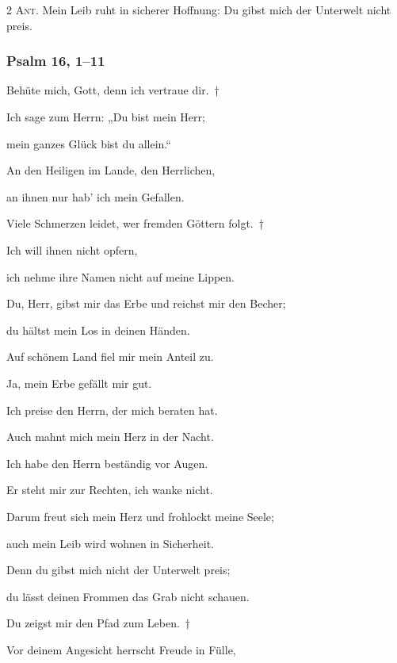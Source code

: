 \vspace{10pt}

\noindent \textsc{2 Ant.} Mein Leib ruht in sicherer Hoffnung: Du gibst mich der Unterwelt nicht preis.

\subsubsection{Psalm 16, 1--11}

\noindent Behüte mich, Gott, denn ich vertraue dir.~†~\nopagebreak

Ich sage zum Herrn: „Du bist mein Herr;~\GreStar{}~\nopagebreak

mein ganzes Glück bist du allein.“

\noindent An den Heiligen im Lande, den Herrlichen,~\GreStar{}~\nopagebreak

an ihnen nur hab’ ich mein Gefallen.

\noindent Viele Schmerzen leidet, wer fremden Göttern folgt.~†~\nopagebreak

Ich will ihnen nicht opfern,~\GreStar{}~\nopagebreak

ich nehme ihre Namen nicht auf meine Lippen.

\noindent Du, Herr, gibst mir das Erbe und reichst mir den Becher;~\GreStar{}~\nopagebreak

du hältst mein Los in deinen Händen.

\noindent Auf schönem Land fiel mir mein Anteil zu.~\GreStar{}~\nopagebreak

Ja, mein Erbe gefällt mir gut.

\noindent Ich preise den Herrn, der mich beraten hat.~\GreStar{}~\nopagebreak

Auch mahnt mich mein Herz in der Nacht.

\noindent Ich habe den Herrn beständig vor Augen.~\GreStar{}~\nopagebreak

Er steht mir zur Rechten, ich wanke nicht.

\noindent Darum freut sich mein Herz und frohlockt meine Seele;~\GreStar{}~\nopagebreak

auch mein Leib wird wohnen in Sicherheit.

\noindent Denn du gibst mich nicht der Unterwelt preis;~\GreStar{}~\nopagebreak

du lässt deinen Frommen das Grab nicht schauen.

\noindent Du zeigst mir den Pfad zum Leben.~†~\nopagebreak

Vor deinem Angesicht herrscht Freude in Fülle,~\GreStar{}~\nopagebreak

